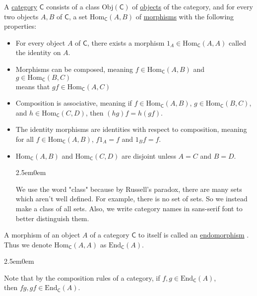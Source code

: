 \documentclass{book}
\newcommand{\hTwo}{%
   \color{MidnightBlue}%
   \fontsize{13}{15}\selectfont%
}
\newenvironment{myIndent}{%
   \begin{adjustwidth}{2.5em}{0em}%
}{%
   \end{adjustwidth}%
}
\newcommand{\udefine}[1]{{%
   \setulcolor{Red}%
   \setul{0.14em}{0.07em}%
   \ul{#1}%
}}
\newcommand{\myObj}{\mathrm{Obj}}
\newcommand{\myHom}{\mathrm{Hom}}
\newcommand{\myEnd}{\mathrm{End}}
\newcommand{\mcateg}[1]{\mathsf{#1}}
\newcommand{\retTwo}{\hfill\bigbreak}
\begin{document}
   A \udefine{category} $\mcateg{C}$ consists of a class $\myObj(\mcateg{C})$ of \udefine{objects} of the category, and for every\\ two objects $A, B$ of $\mcateg{C}$, a set $\myHom_\mcateg{C}(A, B)$ of \udefine{morphisms} with the following\\ properties:
   \begin{itemize}
      \item For every object $A$ of $\mcateg{C}$, there exists a morphism $1_A \in \myHom_\mcateg{C}(A, A)$ called\\ the identity on $A$.
      \item Morphisms can be composed, meaning $f \in \myHom_\mcateg{C}(A, B)$ and $g \in \myHom_\mcateg{C}(B, C)$\\ means that $gf \in \myHom_\mcateg{C}(A, C)$
      \item Composition is associative, meaning if $f \in \myHom_\mcateg{C}(A, B)$, $g \in \myHom_\mcateg{C}(B, C)$,\\ and $h \in \myHom_\mcateg{C}(C, D)$, then $(hg)f = h(gf)$.
      \item The identity morphisms are identities with respect to composition, meaning\\ for all $f \in \myHom_\mcateg{C}(A, B)$, $f1_A = f$ and $1_Bf = f$.
      \item $\myHom_\mcateg{C}(A, B)$ and $\myHom_\mcateg{C}(C, D)$ are disjoint unless $A = C$ and $B = D$.
      
      {\begin{myIndent} \hTwo
         We use the word "class" because by Russell's paradox, there are many sets\\ which aren't well defined. For example, there is no set of sets. So we instead\\ make a class of all sets. \retTwo
         Also, we write category names in sans-serif font to better distinguish them.
      \end{myIndent}}
   \end{itemize}

   A morphism of an object $A$ of a category $\mcateg{C}$ to itself is called an \udefine{endomorphism}.\\ Thus we denote $\myHom_\mcateg{C}(A, A)$ as $\myEnd_\mcateg{C}(A)$.
   {\begin{myIndent} \hTwo
      Note that by the composition rules of a category, if $f, g \in \myEnd_\mcateg{C}(A)$,\\ then $fg, gf \in \myEnd_\mcateg{C}(A)$.\retTwo
   \end{myIndent}}
\end{document}
